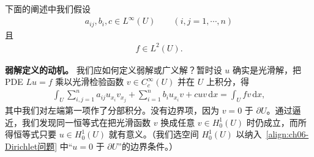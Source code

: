 \documentclass[../../main.tex]{subfiles}
\begin{document}
下面的阐述中我们假设
\begin{align}
a_{ij},b_{i},c\in L^{\infty}(U)\qquad (i,j=1,\cdots,n)
\end{align}
且
\begin{align}
f\in L^{2}(U).
\end{align}

\textbf{弱解定义的动机。} 我们应如何定义弱解或广义解？暂时设 $u$ 确实是光滑解，把 PDE $Lu=f$ 乘以光滑检验函数 $v\in C^{\infty}_{c}(U)$ 并在 $U$ 上积分，得
\begin{align}
\int_{U}\sum_{i,j=1}^{n}a_{ij}u_{x_{i}}v_{x_{j}}+\sum_{i=1}^{n}b_{i}u_{x_{i}}v+cuv\,\mathrm{d}x=\int_{U}fv\,\mathrm{d}x,
\end{align}
其中我们对左端第一项作了分部积分。没有边界项，因为 $v=0$ 于 $\partial U$。通过逼近，我们发现同一恒等式在把光滑函数 $v$ 换成任意 $v\in H^{1}_{0}(U)$ 时仍成立，而所得恒等式只要 $u\in H^{1}_{0}(U)$ 就有意义。（我们选空间 $H^{1}_{0}(U)$ 以纳入~\eqref{align:ch06-Dirichlet问题} 中“$u=0$ 于 $\partial U$”的边界条件。）
\end{document}
